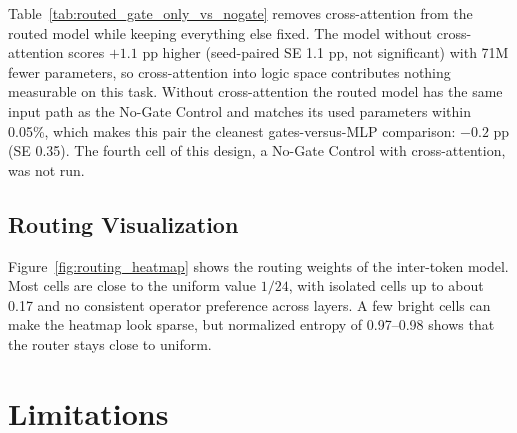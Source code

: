 \documentclass[10pt,twocolumn,letterpaper]{article}
\begin{document}
\begin{table}[t]
\centering
\small
\setlength{\tabcolsep}{4pt}
\caption{ProofWriter with and without cross-attention into logic space, mean
$\pm$ SD over 3 seeds. Without cross-attention the routed stream reads a linear
projection of the backbone hidden state plus its previous state.}
\label{tab:routed_gate_only_vs_nogate}
\end{table}

Table~\ref{tab:routed_gate_only_vs_nogate} removes cross-attention from the
routed model while keeping everything else fixed. The model without
cross-attention scores $+1.1$ pp higher (seed-paired SE 1.1 pp, not
significant) with 71M fewer parameters, so cross-attention into logic space
contributes nothing measurable on this task. Without cross-attention the routed
model has the same input path as the No-Gate Control and matches its used
parameters within 0.05\%, which makes this pair the cleanest gates-versus-MLP
comparison: $-0.2$ pp (SE 0.35). The fourth cell of this design, a No-Gate
Control with cross-attention, was not run.

\subsection{Routing Visualization}
\label{sec:routing_viz}

Figure~\ref{fig:routing_heatmap} shows the routing weights of the
inter-token model. Most cells are close to the uniform value $1/24$, with
isolated cells up to about 0.17 and no consistent operator preference across
layers. A few bright cells can make the heatmap look sparse, but normalized
entropy of 0.97--0.98 shows that the router stays close to uniform.

\section{Limitations}
\end{document}
